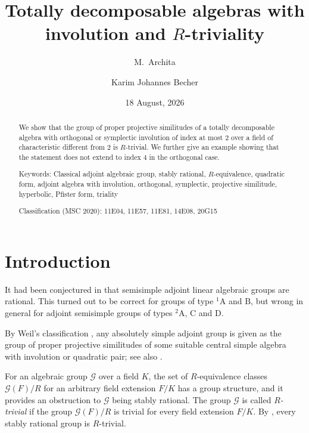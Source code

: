 \documentclass[twoside,11pt]{amsart}
\title{Totally decomposable algebras with involution and \texorpdfstring{$R$}{R}-triviality}
\date{18 August, 2026}
\author{M.~Archita}
\author{Karim Johannes Becher}
\numberwithin{equation}{section}
\theoremstyle{definition}
\newcommand{\mc}{\mathcal}
\newcommand{\dyn}[1]{\mathrm{#1}}
\begin{document}
\begin{abstract}
We show that the group of proper projective similitudes of a totally decomposable algebra with orthogonal or symplectic involution of index at most $2$ over a field of characteristic different from $2$ is $R$-trivial.
We further give an example showing that the statement does not extend to index $4$ in the orthogonal case.

\medskip\noindent
{\sc Keywords:} 
Classical adjoint algebraic group, stably rational, $R$-equiva\-lence, quadratic form, adjoint algebra with involution, orthogonal, symplectic, projective similitude, hyperbolic, Pfister form, triality

\medskip\noindent
{\sc Classification (MSC 2020):} 11E04, %
11E57, %
11E81, %
14E08, %
20G15 %
\end{abstract}

\maketitle

\section{Introduction}

It had been conjectured in \cite[\S 7.2, Conjecture]{PR94} that semisimple adjoint linear algebraic groups are rational.
This turned out to be correct for groups of type ${}^1\!\dyn{A}$ and $\dyn{B}$, but wrong in general for adjoint semisimple groups of  types ${}^2\!\dyn{A}$, $\dyn{C}$ and $\dyn{D}$.


By Weil's classification \cite{Wei61}, any absolutely simple adjoint group is given as the group of proper projective similitudes of some suitable central simple algebra with involution or quadratic pair; see also \cite[\S~26]{KMRT98}.



For an algebraic group $\mc{G}$ over a field $K$, the set of $R$-equivalence classes $\mc{G}(F)/R$ for an arbitrary field extension $F/K$ has a group structure, and it provides an obstruction to $\mc{G}$ being  stably rational.
The group $\mc{G}$ is called \emph{$R$-trivial} if the group $\mc{G}(F)/R$ is trivial for every field extension $F/K$.
By \cite[Prop.~1]{Mer96}, every stably rational group is $R$-trivial.
\end{document}
